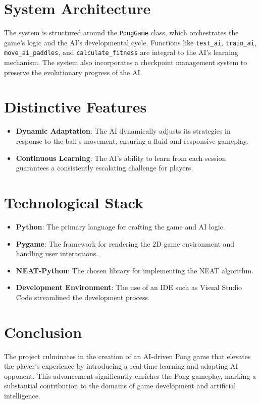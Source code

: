 \documentclass[10pt]{article}
\begin{document}
\section{System Architecture}
The system is structured around the \texttt{PongGame} class, which orchestrates the game's logic and the AI's developmental cycle. Functions like \texttt{test\_ai}, \texttt{train\_ai}, \texttt{move\_ai\_paddles}, and \texttt{calculate\_fitness} are integral to the AI's learning mechanism. The system also incorporates a checkpoint management system to preserve the evolutionary progress of the AI.

\section{Distinctive Features}
\begin{itemize}
    \item \textbf{Dynamic Adaptation}: The AI dynamically adjusts its strategies in response to the ball's movement, ensuring a fluid and responsive gameplay.
    \item \textbf{Continuous Learning}: The AI's ability to learn from each session guarantees a consistently escalating challenge for players.
\end{itemize}

\section{Technological Stack}
\begin{itemize}
    \item \textbf{Python}: The primary language for crafting the game and AI logic.
    \item \textbf{Pygame}: The framework for rendering the 2D game environment and handling user interactions.
    \item \textbf{NEAT-Python}: The chosen library for implementing the NEAT algorithm.
    \item \textbf{Development Environment}: The use of an IDE such as Visual Studio Code streamlined the development process.
\end{itemize}

\section{Conclusion}
The project culminates in the creation of an AI-driven Pong game that elevates the player's experience by introducing a real-time learning and adapting AI opponent. This advancement significantly enriches the Pong gameplay, marking a substantial contribution to the domains of game development and artificial intelligence.
\end{document}

